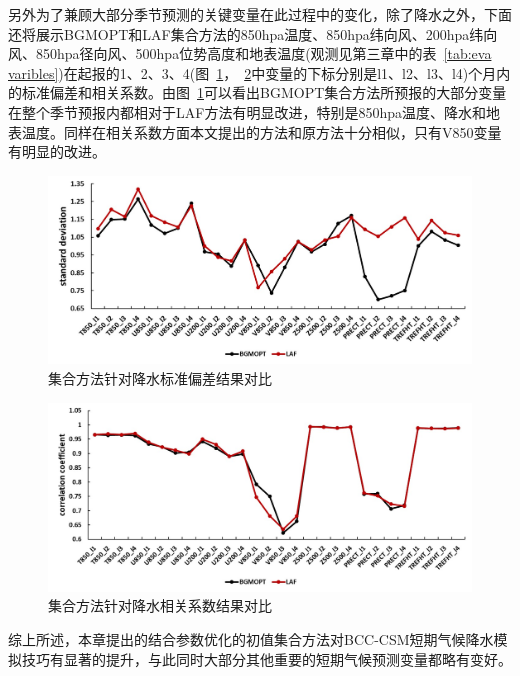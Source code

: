 另外为了兼顾大部分季节预测的关键变量在此过程中的变化，除了降水之外，下面还将展示BGMOPT和LAF集合方法的850hpa温度、850hpa纬向风、200hpa纬向风、850hpa径向风、500hpa位势高度和地表温度(观测见第三章中的表~\ref{tab:eva varibles})在起报的1、2、3、4(图~\ref{fig:rmse bgmopt allvar}，~\ref{fig:coef bgmopt allvar}中变量的下标分别是l1、l2、l3、l4)个月内的标准偏差和相关系数。由图~\ref{fig:rmse bgmopt allvar}可以看出BGMOPT集合方法所预报的大部分变量在整个季节预报内都相对于LAF方法有明显改进，特别是850hpa温度、降水和地表温度。同样在相关系数方面本文提出的方法和原方法十分相似，只有V850变量有明显的改进。

\begin{figure}[H] %
\label{prectresult}
  \centering
  \includegraphics[scale=0.6]{figures/allvar-std.jpg}
  \caption{集合方法针对降水标准偏差结果对比}
  \label{fig:rmse bgmopt allvar}
\end{figure} 

\begin{figure}[H] %
\label{prectresult}
  \centering
  \includegraphics[scale=0.6]{figures/allvar_coef.jpg}
  \caption{集合方法针对降水相关系数结果对比}
  \label{fig:coef bgmopt allvar}
\end{figure} 

综上所述，本章提出的结合参数优化的初值集合方法对BCC-CSM短期气候降水模拟技巧有显著的提升，与此同时大部分其他重要的短期气候预测变量都略有变好。
